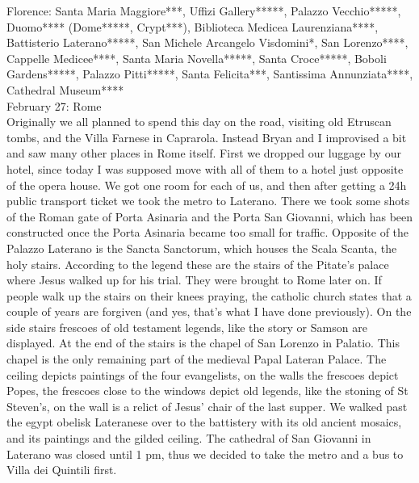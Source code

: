 Florence: Santa Maria Maggiore***, Uffizi Gallery*****, Palazzo Vecchio*****, Duomo**** (Dome*****, Crypt***), Biblioteca Medicea Laurenziana****, Battisterio Laterano*****, San Michele Arcangelo Visdomini*, San Lorenzo****, Cappelle Medicee****, Santa Maria Novella*****, Santa Croce*****, Boboli Gardens*****, Palazzo Pitti*****, Santa Felicita***, Santissima Annunziata****, Cathedral Museum****\\%

February 27: Rome\\%
Originally we all planned to spend this day on the road, visiting old Etruscan tombs, and the Villa Farnese in Caprarola. Instead Bryan and I improvised a bit and saw many other places in Rome itself. First we dropped our luggage by our hotel, since today I was supposed move with all of them to a hotel just opposite of the opera house. We got one room for each of us, and then after getting a 24h public transport ticket we took the metro to Laterano. There we took some shots of the Roman gate of Porta Asinaria and the Porta San Giovanni, which has been constructed once the Porta Asinaria became too small for traffic. Opposite of the Palazzo Laterano is the Sancta Sanctorum, which houses the Scala Scanta, the holy stairs. According to the legend these are the stairs of the Pitate's palace where Jesus walked up for his trial. They were brought to Rome later on. If people walk up the stairs on their knees praying, the catholic church states that a couple of years are forgiven (and yes, that's what I have done previously). On the side stairs frescoes of old testament legends, like the story or Samson are displayed. At the end of the stairs is the chapel of San Lorenzo in Palatio. This chapel is the only remaining part of the medieval Papal Lateran Palace. The ceiling depicts paintings of the four evangelists, on the walls the frescoes depict Popes, the frescoes close to the windows depict old legends, like the stoning of St Steven's, on the wall is a relict of Jesus' chair of the last supper. We walked past the egypt obelisk Lateranese over to the battistery with its old ancient mosaics, and its paintings and the gilded ceiling. The cathedral of San Giovanni in Laterano was closed until 1 pm, thus we decided to take the metro and a bus to Villa dei Quintili first.\\
